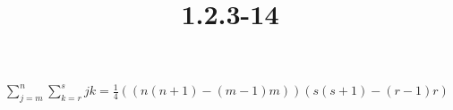 \documentclass{article}
\title{1.2.3-14}
\begin{document}
\maketitle

\( \sum_{j=m}^n\sum_{k=r}^s jk = \frac{1}{4}((n(n+1)-(m-1)m))(s(s+1)-(r-1)r) \)
\end{document}
